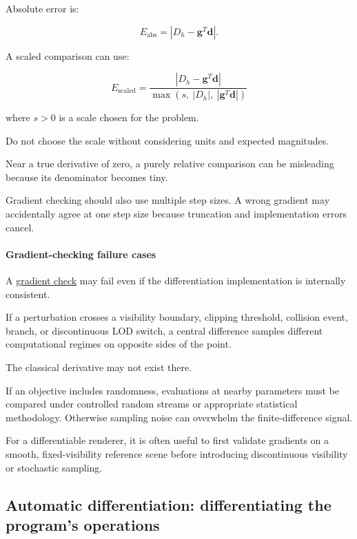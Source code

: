 \hypertarget{02-foundations-ii-ch022-how-should-disagreement-be-measured}{}

Absolute error is:

\[
E_{\mathrm{abs}}= |D_h-\mathbf g^T\mathbf d|.
\]

A scaled comparison can use:

\[
\boxed{ E_{\mathrm{scaled}} = \frac{ |D_h-\mathbf g^T\mathbf d| }{ \max(s,\ |D_h|,\ |\mathbf g^T\mathbf d|) } }
\]

where \(s>0\) is a scale chosen for the problem.

Do not choose the scale without considering units and expected magnitudes.

Near a true derivative of zero, a purely relative comparison can be misleading because its denominator becomes tiny.

Gradient checking should also use multiple step sizes. A wrong gradient may accidentally agree at one step size because truncation and implementation errors cancel.

\paragraph{Gradient-checking failure cases}\label{02-foundations-ii-ch022-gradient-checking-failure-cases}

\hypertarget{02-foundations-ii-ch022-gradient-checking-failure-cases}{}

A \hyperref[02-foundations-ii-ch022-numerical-differentiation-and-automatic-differentiation]{gradient check} may fail even if the differentiation implementation is internally consistent.

If a perturbation crosses a visibility boundary, clipping threshold, collision event,  branch, or discontinuous LOD switch, a central difference samples different computational regimes on opposite sides of the point.

The classical derivative may not exist there.

If an objective includes randomness, evaluations at nearby parameters must be compared under controlled random streams or appropriate statistical methodology. Otherwise sampling noise can overwhelm the finite-difference signal.

For a differentiable renderer, it is often useful to first validate gradients on a smooth, fixed-visibility reference scene before introducing discontinuous visibility or stochastic sampling.

\subsection{Automatic differentiation: differentiating the program's operations}\label{02-foundations-ii-ch022-automatic-differentiation-differentiating-the-programs-operations}


